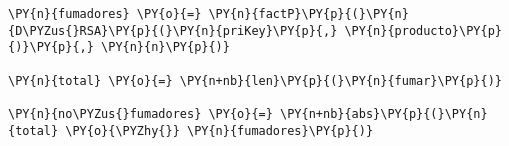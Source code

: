 
\begin{Verbatim}[commandchars=\\\{\}]
\PY{n}{fumadores} \PY{o}{=} \PY{n}{factP}\PY{p}{(}\PY{n}{D\PYZus{}RSA}\PY{p}{(}\PY{n}{priKey}\PY{p}{,} \PY{n}{producto}\PY{p}{)}\PY{p}{,} \PY{n}{n}\PY{p}{)}

\PY{n}{total} \PY{o}{=} \PY{n+nb}{len}\PY{p}{(}\PY{n}{fumar}\PY{p}{)}

\PY{n}{no\PYZus{}fumadores} \PY{o}{=} \PY{n+nb}{abs}\PY{p}{(}\PY{n}{total} \PY{o}{\PYZhy{}} \PY{n}{fumadores}\PY{p}{)}
\end{Verbatim}